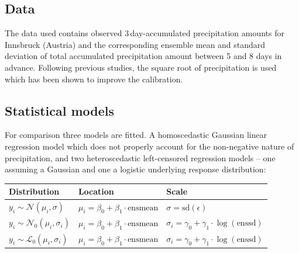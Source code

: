 \documentclass[twoside]{report}
\begin{document}

\subsection{Data}

The data used contains observed 3\,day-accumulated precipitation amounts for
Innsbruck (Austria) and the corresponding ensemble mean and standard deviation
of total accumulated precipitation amount between 5 and 8 days in advance.
Following previous studies, the square root of precipitation is used which has
been shown to improve the calibration.


\subsection{Statistical models}

For comparison three models are fitted. A homoscedastic Gaussian linear regression
model which does not properly account for the non-negative nature of precipitation,
and two heteroscedastic left-censored regression models --
one assuming a Gaussian and one a logistic underlying response distribution:

\begin{table}[!ht]\centering
    \begin{tabular}{lll}
         Distribution                              & Location                                         & Scale \\
        \midrule[0.09 em]
        $y_i \sim \mathcal{N}(\mu_i, \sigma)$     & $\mu_i = \beta_0 + \beta_1 \cdot \text{ensmean}$ & $\sigma = \text{sd}(\epsilon)$ \\
        $y_i \sim \mathcal{N}_0(\mu_i, \sigma_i)$ & $\mu_i = \beta_0 + \beta_1 \cdot \text{ensmean}$ & $\sigma_i = \gamma_0 + \gamma_1 \cdot \log(\text{enssd})$ \\
        $y_i \sim \mathcal{L}_0(\mu_i, \sigma_i)$ & $\mu_i = \beta_0 + \beta_1 \cdot \text{ensmean}$ & $\sigma_i = \gamma_0 + \gamma_1 \cdot \log(\text{enssd})$ \\
        \bottomrule[0.09 em]
    \end{tabular}
\end{table}
\end{document}
